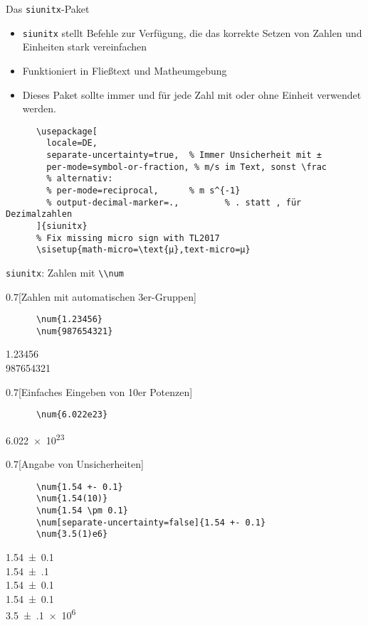 \begin{frame}[fragile]{
  Das \texttt{siunitx}-Paket
  \hfill
}
\begin{itemize}
    \item \texttt{siunitx} stellt Befehle zur Verfügung, die das korrekte Setzen von Zahlen und Einheiten stark vereinfachen
    \item Funktioniert in Fließtext und Matheumgebung
    \item[$\color{vertexDarkRed}\Rightarrow$] Dieses Paket sollte \alert{immer} und für \alert{jede} Zahl mit oder ohne Einheit verwendet werden.
\end{itemize}
  \begin{Packages}
    \begin{lstlisting}
      \usepackage[
        locale=DE,
        separate-uncertainty=true,  % Immer Unsicherheit mit ±
        per-mode=symbol-or-fraction, % m/s im Text, sonst \frac
        % alternativ:
        % per-mode=reciprocal,      % m s^{-1}
        % output-decimal-marker=.,         % . statt , für Dezimalzahlen
      ]{siunitx}
      % Fix missing micro sign with TL2017
      \sisetup{math-micro=\text{µ},text-micro=µ}
    \end{lstlisting}
  \end{Packages}
\end{frame}

\begin{frame}[fragile]{\texttt{siunitx}: Zahlen mit \lstinline+\\num+}
  \begin{CodeExample}{0.7}[Zahlen mit automatischen 3er-Gruppen]
    \begin{lstlisting}
      \num{1.23456}
      \num{987654321}
    \end{lstlisting}
  \CodeResult
    \strut
    \num{1.23456} \\
    \num{987654321}
  \end{CodeExample}
  \begin{CodeExample}{0.7}[Einfaches Eingeben von 10er Potenzen]
    \begin{lstlisting}
      \num{6.022e23}
    \end{lstlisting}
  \CodeResult
    \strut
    \num{6.022e23}
  \end{CodeExample}
  \begin{CodeExample}{0.7}[Angabe von Unsicherheiten]
    \begin{lstlisting}
      \num{1.54 +- 0.1}
      \num{1.54(10)}
      \num{1.54 \pm 0.1}
      \num[separate-uncertainty=false]{1.54 +- 0.1}
      \num{3.5(1)e6}
    \end{lstlisting}
  \CodeResult
    \strut
    \num{1.54 +- 0.1} \\
    \num{1.54(10)} \\
    \num{1.54 \pm 0.1} \\
    \num[separate-uncertainty=false]{1.54 +- 0.1} \\
    \num{3.5(1)e6}
  \end{CodeExample}
\end{frame}

